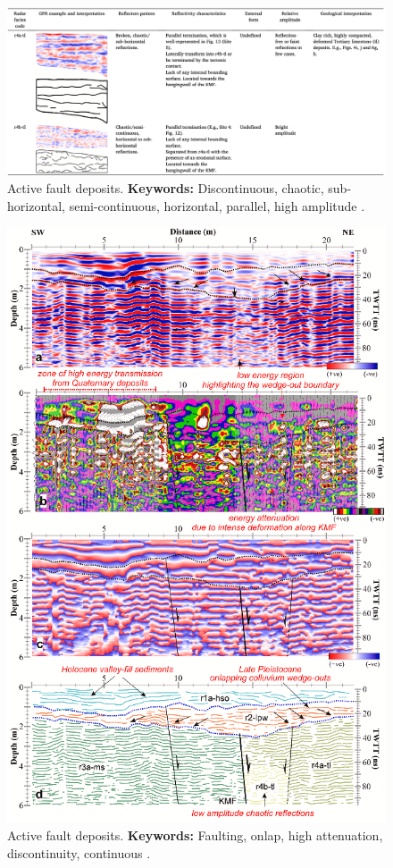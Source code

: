\begin{landscape}
\begin{figure}[h!]
    \centering
    \includegraphics[width=0.9\linewidth]{Figures/0.2GPR/Shaikh2022_fault_2.png}
    \caption[Active fault deposits.]{Active fault deposits. \textbf{Keywords: } Discontinuous, chaotic, sub-horizontal, semi-continuous, horizontal, parallel, high amplitude \citep{Shaikh2022}.}
    \label{fig:Shaikh2022-2}
\end{figure}
\end{landscape}
\clearpage

\begin{figure}[h!]
    \centering
    \includegraphics[width=0.9\linewidth]{Figures/0.2GPR/Shaikh2022_fault_3.png}
    \caption[Active fault deposits.]{Active fault deposits. \textbf{Keywords: } Faulting, onlap, high attenuation, discontinuity, continuous \citep{Shaikh2022}.}
    \label{fig:Shaikh2022-3}
\end{figure}
